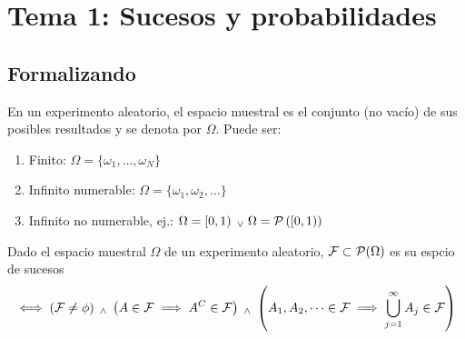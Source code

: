 \section{Tema 1: Sucesos y probabilidades}
\subsection{Formalizando}
\begin{defn}
	En un experimento aleatorio, el espacio muestral es el conjunto (no vacío) de sus posibles resultados y se denota por $\Omega$. Puede ser:
	\begin{enumerate}[topsep=1pt, itemsep=1pt,parsep=3pt]
		\item Finito: $\Omega = \{\omega_1, \dots, \omega_N\}$
		\item Infinito numerable: $\Omega = \{\omega_1, \omega_2, \dots\}$
		\item Infinito no numerable, ej.: $\Omega = \left[0, 1\right) \; _{\vee} \; \Omega = \mathcal{P}\left(\left[0, 1\right)\right)$
	\end{enumerate}
\end{defn}
\begin{defn}
	Dado el espacio muestral $\Omega$ de un experimento aleatorio, $\mathcal{F} \subset \mathcal{P}(\Omega)$ es su espcio de sucesos
	\[\iff \left(\mathcal{F} \ne \phi\right) \; _{\wedge} \; \left(A \in \mathcal{F} \implies A^C \in \mathcal{F}\right) \; _{\wedge} \; \left(A_1,A_2, \dots \in \mathcal{F} \implies \bigcup_{j=1}^{\infty} A_j \in \mathcal{F}\right)\]
\end{defn}



